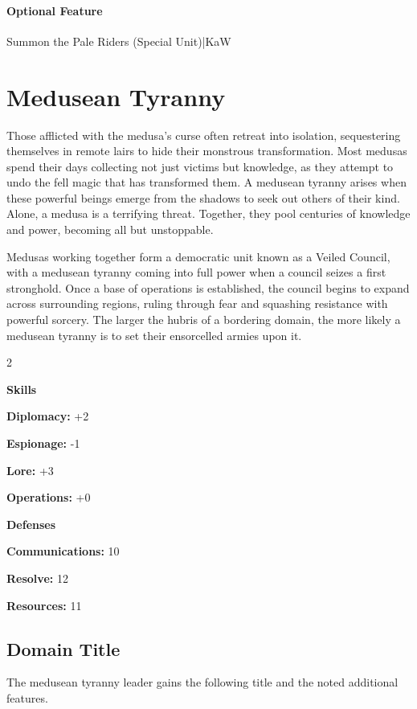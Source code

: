 \documentclass[10pt,a4paper,twoside,bg=print,twocolumn,openany,nodeprecatedcode]{dndbook}
\begin{document}
\paragraph{Optional Feature}
Summon the Pale Riders (Special Unit)|KaW

\section{Medusean Tyranny}
Those afflicted with the medusa's curse often retreat into isolation, sequestering themselves in remote lairs to hide their monstrous transformation. Most medusas spend their days collecting not just victims but knowledge, as they attempt to undo the fell magic that has transformed them. A medusean tyranny arises when these powerful beings emerge from the shadows to seek out others of their kind. Alone, a medusa is a terrifying threat. Together, they pool centuries of knowledge and power, becoming all but unstoppable.

Medusas working together form a democratic unit known as a Veiled Council, with a medusean tyranny coming into full power when a council seizes a first stronghold. Once a base of operations is established, the council begins to expand across surrounding regions, ruling through fear and squashing resistance with powerful sorcery. The larger the hubris of a bordering domain, the more likely a medusean tyranny is to set their ensorcelled armies upon it.


\begin{itemize}
\begin{multicols}{2}
\item \textbf{Skills}
\item \textbf{Diplomacy:} +2
\item \textbf{Espionage:} -1
\item \textbf{Lore:} +3
\item \textbf{Operations:} +0
\item \textbf{Defenses}
\item \textbf{Communications:} 10
\item \textbf{Resolve:} 12
\item \textbf{Resources:} 11
\end{multicols}

\end{itemize}

\subsection{Domain Title}
The medusean tyranny leader gains the following title and the noted additional features.
\end{document}
